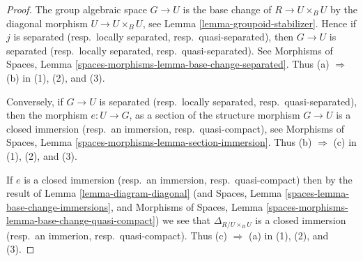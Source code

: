 \begin{proof}
The group algebraic space $G \to U$ is the base change of $R \to U \times_B U$
by the diagonal morphism $U \to U \times_B U$, see
Lemma \ref{lemma-groupoid-stabilizer}. Hence if
$j$ is separated (resp.\ locally separated, resp.\ quasi-separated),
then $G \to U$ is separated (resp.\ locally separated, resp.\ quasi-separated).
See
Morphisms of Spaces, Lemma
\ref{spaces-morphisms-lemma-base-change-separated}.
Thus (a) $\Rightarrow$ (b) in (1), (2), and (3).

\medskip\noindent
Conversely, if $G \to U$ is separated
(resp.\ locally separated, resp.\ quasi-separated), then the morphism
$e : U \to G$, as a section of the structure morphism $G \to U$ is a closed
immersion (resp.\ an immersion, resp.\ quasi-compact), see
Morphisms of Spaces, Lemma \ref{spaces-morphisms-lemma-section-immersion}.
Thus (b) $\Rightarrow$ (c) in (1), (2), and (3).

\medskip\noindent
If $e$ is a closed immersion (resp.\ an immersion, resp.\ quasi-compact)
then by the result of
Lemma \ref{lemma-diagram-diagonal}
(and
Spaces, Lemma \ref{spaces-lemma-base-change-immersions}, and
Morphisms of Spaces,
Lemma \ref{spaces-morphisms-lemma-base-change-quasi-compact})
we see that $\Delta_{R/U \times_B U}$ is a closed
immersion (resp.\ an immerion, resp.\ quasi-compact).
Thus (c) $\Rightarrow$ (a) in (1), (2), and (3).
\end{proof}





















